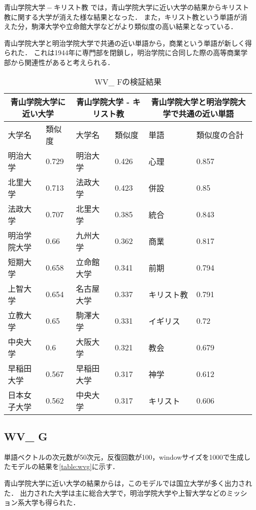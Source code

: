 $ 青山学院大学 - キリスト教 $ では，青山学院大学に近い大学の結果からキリスト教に関する大学が消えた様な結果となった．
また，キリスト教という単語が消えた分，駒澤大学や立命館大学などがより類似度の高い結果となっている．

青山学院大学と明治学院大学で共通の近い単語から，商業という単語が新しく得られた．
これは1944年に専門部を閉鎖し，明治学院に合同した際の高等商業学部から関連性があると考えられる．

\begin{table}[H]
\caption{WV\_ Fの検証結果}
\centering
\footnotesize
\begin{tabular}{ll|ll|ll}
\hline
\multicolumn{2}{c}{青山学院大学に近い大学} & \multicolumn{2}{c}{青山学院大学 - キリスト教} & \multicolumn{2}{c}{青山学院大学と明治学院大学で共通の近い単語}
\\ \hline
大学名 & 類似度 & 大学名 & 類似度 & 単語 & 類似度の合計
\\ \hline \hline
明治大学 & 0.729 & 明治大学 & 0.426 & 心理 & 0.857\\
北里大学 & 0.713 & 法政大学 & 0.423 & 併設 & 0.85\\
法政大学 & 0.707 & 北里大学 & 0.385 & 統合 & 0.843\\
明治学院大学 & 0.66 & 九州大学 & 0.362 & 商業 & 0.817\\
短期大学 & 0.658 & 立命館大学 & 0.341 & 前期 & 0.794\\
上智大学 & 0.654 & 名古屋大学 & 0.337 & キリスト教 & 0.791\\
立教大学 & 0.65 & 駒澤大学 & 0.331 & イギリス & 0.72\\
中央大学 & 0.6 & 大阪大学 & 0.321 & 教会 & 0.679\\
早稲田大学 & 0.567 & 早稲田大学 & 0.317 & 神学 & 0.612\\
日本女子大学 & 0.562 & 中央大学 & 0.317 & キリスト & 0.606\\ \hline
\end{tabular}
\label{table:wvf}
\end{table}


\subsection{WV\_ G}
単語ベクトルの次元数が50次元，反復回数が100，windowサイズを1000で生成したモデルの結果を\ref{table:wvg}に示す．

青山学院大学に近い大学の結果からは，このモデルでは国立大学が多く出力された．
出力された大学は主に総合大学で，明治学院大学や上智大学などのミッション系大学も得られた．

